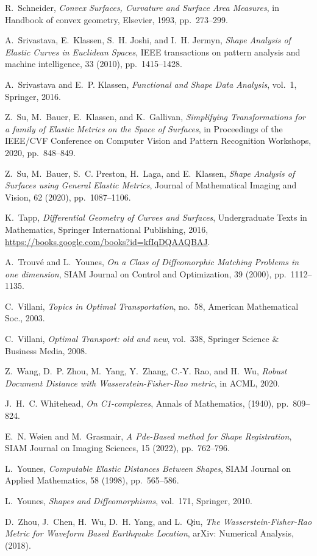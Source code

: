 \documentclass[final,hidelinks,onefignum,onetabnum]{siamart220329}
\begin{document}
\begin{thebibliography}{10}
{\sc R.~Schneider}, {\em Convex Surfaces, Curvature and Surface Area Measures}, in Handbook of convex geometry, Elsevier, 1993, pp.~273--299.

{\sc A.~Srivastava, E.~Klassen, S.~H. Joshi, and I.~H. Jermyn}, {\em Shape Analysis of Elastic Curves in Euclidean Spaces}, IEEE transactions on pattern analysis and machine intelligence, 33 (2010), pp.~1415--1428.

{\sc A.~Srivastava and E.~P. Klassen}, {\em Functional and Shape Data Analysis}, vol.~1, Springer, 2016.

{\sc Z.~Su, M.~Bauer, E.~Klassen, and K.~Gallivan}, {\em Simplifying Transformations for a family of Elastic Metrics on the Space of Surfaces}, in Proceedings of the IEEE/CVF Conference on Computer Vision and Pattern Recognition Workshops, 2020, pp.~848--849.

{\sc Z.~Su, M.~Bauer, S.~C. Preston, H.~Laga, and E.~Klassen}, {\em Shape Analysis of Surfaces using General Elastic Metrics}, Journal of Mathematical Imaging and Vision, 62 (2020), pp.~1087--1106.

{\sc K.~Tapp}, {\em Differential Geometry of Curves and Surfaces}, Undergraduate Texts in Mathematics, Springer International Publishing, 2016, \url{https://books.google.com/books?id=kfIqDQAAQBAJ}.

{\sc A.~Trouv{\'e} and L.~Younes}, {\em On a Class of Diffeomorphic Matching Problems in one dimension}, SIAM Journal on Control and Optimization, 39 (2000), pp.~1112--1135.

{\sc C.~Villani}, {\em Topics in Optimal Transportation}, no.~58, American Mathematical Soc., 2003.

{\sc C.~Villani}, {\em Optimal Transport: old and new}, vol.~338, Springer Science \& Business Media, 2008.

{\sc Z.~Wang, D.~P. Zhou, M.~Yang, Y.~Zhang, C.-Y. Rao, and H.~Wu}, {\em Robust Document Distance with Wasserstein-Fisher-Rao metric}, in ACML, 2020.

{\sc J.~H.~C. Whitehead}, {\em {On {C}1-complexes}}, Annals of Mathematics,  (1940), pp.~809--824.

{\sc E.~N. W{\o}ien and M.~Grasmair}, {\em A Pde-Based method for Shape Registration}, SIAM Journal on Imaging Sciences, 15 (2022), pp.~762--796.

{\sc L.~Younes}, {\em Computable Elastic Distances Between Shapes}, SIAM Journal on Applied Mathematics, 58 (1998), pp.~565--586.

{\sc L.~Younes}, {\em Shapes and Diffeomorphisms}, vol.~171, Springer, 2010.

{\sc D.~Zhou, J.~Chen, H.~Wu, D.~H. Yang, and L.~Qiu}, {\em The Wasserstein-Fisher-Rao Metric for Waveform Based Earthquake Location}, arXiv: Numerical Analysis,  (2018).

\end{thebibliography}
\end{document}
